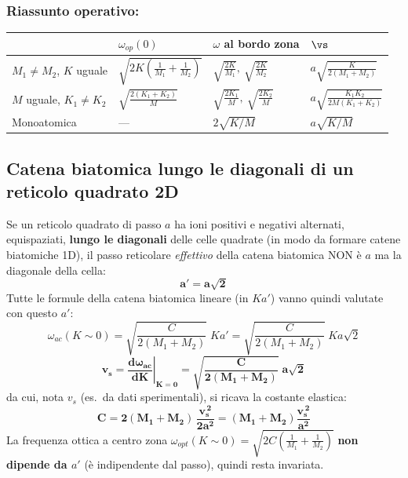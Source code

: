 \subsubsection*{Riassunto operativo:}
\begin{center}
\renewcommand{\arraystretch}{1.6}
\begin{tabular}{l l l l}
\toprule
& $\omega_{op}(0)$ & $\omega$ al bordo zona & $\vs$ \\
\midrule
$M_1\neq M_2$, $K$ uguale & $\sqrt{2K\left(\frac{1}{M_1}+\frac{1}{M_2}\right)}$ & $\sqrt{\frac{2K}{M_1}},\ \sqrt{\frac{2K}{M_2}}$ & $a\sqrt{\frac{K}{2(M_1+M_2)}}$ \\
$M$ uguale, $K_1\neq K_2$ & $\sqrt{\frac{2(K_1+K_2)}{M}}$ & $\sqrt{\frac{2K_1}{M}},\ \sqrt{\frac{2K_2}{M}}$ & $a\sqrt{\frac{K_1K_2}{2M(K_1+K_2)}}$ \\
Monoatomica & --- & $2\sqrt{K/M}$ & $a\sqrt{K/M}$ \\
\bottomrule
\end{tabular}
\end{center}

\subsection{Catena biatomica lungo le diagonali di un reticolo quadrato 2D}
Se un reticolo quadrato di passo $a$ ha ioni positivi e negativi alternati,
equispaziati, \textbf{lungo le diagonali} delle celle quadrate (in modo da formare
catene biatomiche 1D), il passo reticolare \emph{effettivo} della catena biatomica
NON è $a$ ma la diagonale della cella:
\[ \bm{a' = a\sqrt{2}} \]
Tutte le formule della catena biatomica lineare (in $K a'$) vanno quindi valutate con
questo $a'$:
\[ \omega_{ac}(K\sim0) = \sqrt{\frac{C}{2(M_1+M_2)}}\;K a' = \sqrt{\frac{C}{2(M_1+M_2)}}\;K a\sqrt2 \]
\[ \bm{v_s = \left.\frac{d\omega_{ac}}{dK}\right|_{K=0} = \sqrt{\frac{C}{2(M_1+M_2)}}\;a\sqrt2} \]
da cui, nota $v_s$ (es.\ da dati sperimentali), si ricava la costante elastica:
\[ \bm{C = 2(M_1+M_2)\,\frac{v_s^{\,2}}{2a^2} = (M_1+M_2)\frac{v_s^{\,2}}{a^2}} \]
La frequenza ottica a centro zona $\omega_{opt}(K\sim0)=\sqrt{2C\!\left(\frac1{M_1}+\frac1{M_2}\right)}$
\textbf{non dipende da $a'$} (è indipendente dal passo), quindi resta invariata.


